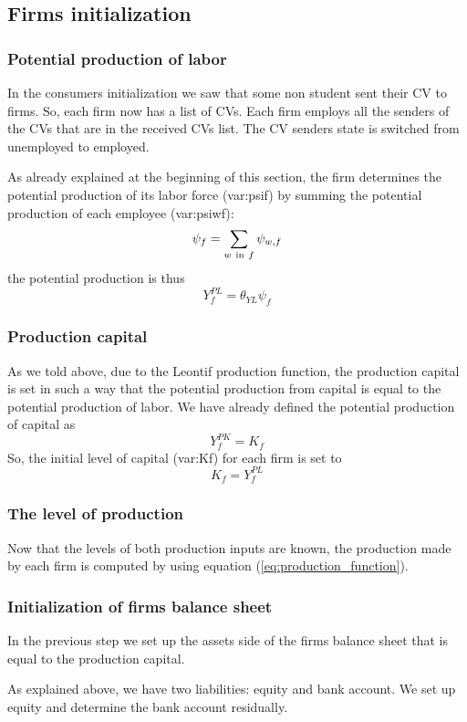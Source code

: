 \documentclass{book}
\begin{document}
\subsection{Firms initialization}
\subsubsection{Potential production of labor}
In the consumers initialization we saw that some non student sent their CV to firms.
So, each firm now has a list of CVs. Each firm employs all the senders of the CVs that are in the received CVs list. The CV senders state is switched from unemployed to employed.

As already explained at the beginning of this section, the firm determines the potential production of its labor force (\gls{var:psif}) by summing the potential production of each employee (\gls{var:psiwf}):
\[
	\psi_f=\sum_{w \ \textnormal{in} \ f}\psi_{w,f}
\]
the potential production is thus
\[
	Y^{PL}_f=\theta_{YL}\psi_f
\]

\subsubsection{Production capital}
As we told above, due to the Leontif production function, the production capital is set in such a way that the potential production from capital is equal to the potential production of labor. We have already defined the potential production of capital as
\[Y_f^{PK}=K_f\]
So, the initial level of capital (\gls{var:Kf}) for each firm is set to
\[
K_f=Y^{PL}_f
\]

\subsubsection{The level of production}

Now that the levels of both production inputs are known, the production made by each firm is computed by using equation (\ref{eq:production_function}).

\subsubsection{Initialization of firms balance sheet}

In the previous step we set up the assets side of the firms balance sheet that is equal to the production capital.

As explained above, we have two liabilities: equity and bank account. We set up equity and determine the bank account residually.
\end{document}
